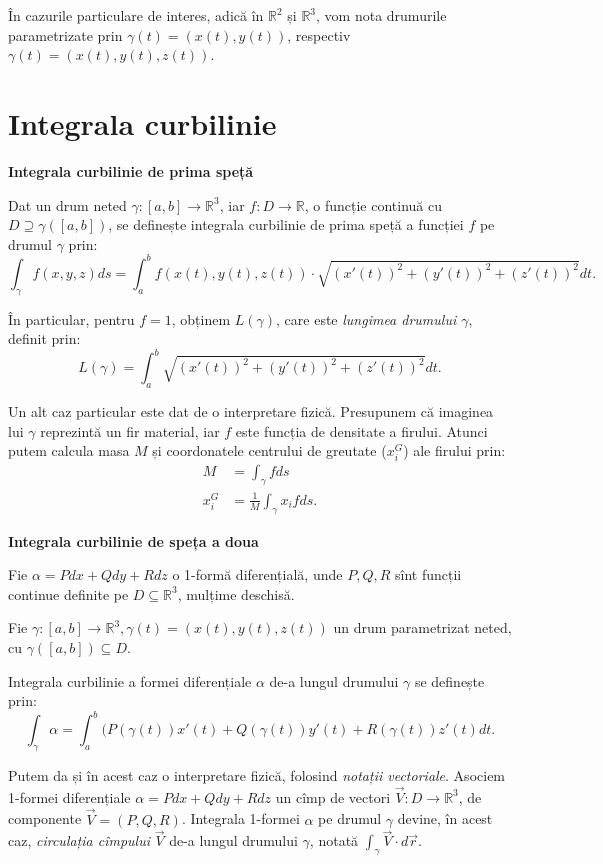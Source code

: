 \documentclass[11pt,a4paper]{article}
\newcommand\seq{\subseteq}
\newcommand\RR{\mathbb{R}}
\theoremstyle{dotless}
\theoremstyle{dotlessdr}
\begin{document}
În cazurile particulare de interes, adică în $\RR^2$ și $\RR^3$, vom
nota drumurile parametrizate prin $\gamma(t) = (x(t), y(t))$, respectiv
$\gamma(t) = (x(t), y(t), z(t))$.


\section{Integrala curbilinie}
\label{sec:int-curb}

\textbf{Integrala curbilinie de prima speță}

Dat un drum neted $\gamma : [a, b] \to \RR^3$, iar $f : D \to \RR$, o funcție
continuă cu $D \supseteq \gamma([a, b])$, se definește integrala curbilinie
de prima speță a funcției $f$ pe drumul $\gamma$ prin:
\[
  \int_\gamma f(x, y, z) ds = \int_a^b f(x(t), y(t), z(t)) \cdot %
  \sqrt{(x'(t))^2 + (y'(t))^2 + (z'(t))^2} dt.
\]

În particular, pentru $f = 1$, obținem $L(\gamma)$, care este
\emph{lungimea drumului $\gamma$}, definit prin:
\[
  L(\gamma) = \int_a^b \sqrt{(x'(t))^2 + (y'(t))^2 + (z'(t))^2} dt.
\]

Un alt caz particular este dat de o interpretare fizică. Presupunem că imaginea
lui $\gamma$ reprezintă un fir material, iar $f$ este funcția de densitate a firului.
Atunci putem calcula masa $M$ și coordonatele centrului de greutate
($x_i^G$) ale firului prin:
\begin{align*}
  M &= \int_\gamma f ds \\
  x_i^G &= \frac{1}{M} \int_\gamma x_i f ds.
\end{align*}

\vspace{1cm}

\textbf{Integrala curbilinie de speța a doua}

Fie $\alpha = P dx + Q dy + R dz$ o 1-formă diferențială, unde $P, Q, R$ sînt
funcții continue definite pe $D \seq \RR^3$, mulțime deschisă.

Fie $\gamma : [a, b] \to \RR^3, \gamma(t) = (x(t), y(t), z(t))$ un drum
parametrizat neted, cu $\gamma([a, b]) \seq D$.

Integrala curbilinie a formei diferențiale $\alpha$ de-a lungul drumului $\gamma$
se definește prin:
\[
  \int_\gamma \alpha = \int_a^b (P(\gamma(t))x'(t) + Q(\gamma(t))y'(t) + %
  R(\gamma(t))z'(t) dt.
\]

Putem da și în acest caz o interpretare fizică, folosind \emph{notații vectoriale}.
Asociem 1-formei diferențiale $\alpha = P dx + Q dy + R dz$ un cîmp de vectori
$\vec{V} : D \to \RR^3$, de componente $\vec{V} = (P, Q, R)$. Integrala 1-formei
$\alpha$ pe drumul $\gamma$ devine, în acest caz, \emph{circulația cîmpului} $\vec{V}$
de-a lungul drumului $\gamma$, notată $\int_\gamma \vec{V} \cdot d\vec{r}$.
\end{document}
